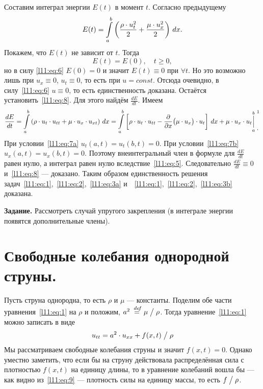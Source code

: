 \documentclass[12pt,a4paper,openany,fleqn]{book}
\newcommand {\defeq}{\stackrel{\hspace{0.09 cm}de\!f}{=}}
\newcommand {\eqdef}{\defeq}
\newcommand{\der}[2]{\ensuremath{\frac{d#1}{d#2}}}
\newcommand{\pder}[2]{\ensuremath{\frac{\partial#1}{\partial#2}}}
\theoremstyle{definition}
\begin{document}
Составим интеграл энергии $E(t)$ в момент $t$. Согласно предыдущему 
\begin{equation*}
	\hfill E(t)=\int\limits_a^b\left(\frac{\rho\cdot u^2_t}{2}+\frac{\mu\cdot u^2_x}{2}\right)\,dx.\hfill
\end{equation*} 
Покажем, что $E(t)$ не зависит от $t$. Тогда 
\begin{equation}
	\label{l11:eq:8}
	E(t)=E(0),\quad t\geqslant0,
\end{equation}
но в силу \eqref{l11:eq:6} $E(0)=0$ и значит $E(t)\equiv0$ при $\forall t$. Но это возможно лишь при $u_x\equiv0$, $u_t\equiv0$, то есть при $u=const$. Отсюда очевидно, в силу~\eqref{l11:eq:6} $u\equiv0$, то есть единственность доказана. Остаётся установить~\eqref{l11:eq:8}. Для этого найдём $\der{E}{t}$. Имеем 
\begin{equation*}
	\der{E}{t}=\int\limits_a^b\left(\rho\cdot u_t\cdot u_{tt}+\mu\cdot u_x\cdot u_{xt}\right)\,dx=\int\limits_a^b\left[\rho\cdot u_t\cdot u_{tt}-\pder{}{x}\big(\mu\cdot u_x\big)\cdot u_t\right]\,dx+\mu\cdot u_x\cdot u_t{\mathop{\Big|}\limits_a^b}\phantom{|}{\vphantom{\bigg|}}^{\footnotemark{}}_{\displaystyle.}
\end{equation*}
При условии~\eqref{l11:eq:7a} $u_t(a,t)=u_t(b,t)=0$. При условии~\eqref{l11:eq:7b} $u_x(a,t)=u_x(b,t)=0$. Поэтому внеинтегральный член в формуле для $\der{E}{t}$ равен нулю, а интеграл равен нулю вследствие~\eqref{l11:eq:5}. Следовательно $\der{E}{t}\equiv0$ и~\eqref{l11:eq:8} --- доказано. Таким образом единственность решения задач~\eqref{l11:eq:1},~\eqref{l11:eq:2},~\eqref{l11:eq:3a} и~~\eqref{l11:eq:1},~\eqref{l11:eq:2},~\eqref{l11:eq:3b} доказана.
\vspace{0.2cm}

\noindent\textbf{Задание. }Рассмотреть случай упругого закрепления (в интеграле энергии появятся дополнительные члены).

\section{Свободные колебания однородной струны.}
\label{lecture11section2}
Пусть струна однородна, то есть $\rho$ и $\mu$ --- константы. Поделим обе части уравнения~\eqref{l11:eq:1} на $\rho$ и положим, $a^2\eqdef{\mu}\bigm/{\rho}$. Тогда уравнение~\eqref{l11:eq:1} можно записать в виде
\begin{equation}
	\label{l11:eq:9}
	\hfill u_{tt}=a^2\cdot u_{xx}+f(x,t)\bigm/\rho\hfill
\end{equation}
Мы рассматриваем свободные колебания струны и значит $f(x,t)=0$. Однако уместно заметить, что если бы на струну действовала распределённая сила с плотностью $f(x,t)$ на единицу длины, то в уравнение колебаний вошла бы --- как видно из~\eqref{l11:eq:9} --- плотность силы на единицу массы, то есть $f\bigm/\rho$.
\end{document}
